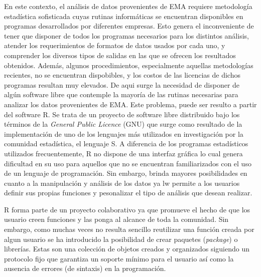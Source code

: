 En este contexto, el análisis de datos provenientes de EMA requiere metodología estadística sofisticada cuyas rutinas informáticas se encuentran disponibles en programas desarrollados por diferentes empresas. Esto genera el inconveniente de tener que disponer de todos los programas necesarios para los distintos análisis, atender los requerimientos de formatos de datos usados por cada uno, y comprender los diversos tipos de salidas en las que se ofrecen los resultados obtenidos. Además, algunos procedimientos, especialmente aquellas metodologías recientes, no se encuentran dispobibles, y los costos de las licencias de dichos programas resultan muy elevados. De aqui surge la necesidad de disponer de algún software libre que contemple la mayoría de las rutinas necesarias para analizar los datos provenientes de EMA. Este problema, puede ser resulto a partir del software R. Se trata de un proyecto de software libre distribuido bajo los términos de la \emph{General Public Licence} (GNU) que surge como resultado de la implementación de uno de los lenguajes más utilizados en investigación por la comunidad estadística, el lenguaje S. A diferencia de los programas estadísticos utilizados frecuentemente, R no dispone de una interfaz gráfica lo cual genera dificultad en su uso para aquellos que no se encuentran familiarizados con el uso de un lenguaje de programación. Sin embargo, brinda mayores posibilidades en cuanto a la manipulación y análisis de los datos ya lw permite a los usuarios definir sus propias funciones y  pesonalizar el tipo de análisis que desean realizar. 

R forma parte de un proyecto colaborativo ya que promueve el hecho de que los usuario creen funciones y las ponga al alcance de toda la comunidad.  Sin embargo, como muchas veces no resulta sencillo reutilizar una función creada por algun usuario se ha introducido la posibilidad de crear paquetes (\emph{package}) o librerías. Estas son una colección de objetos creados y organizados siguiendo un protocolo fijo que garantiza un soporte mínimo para el usuario así como la ausencia de errores (de sintaxis) en la programación.

